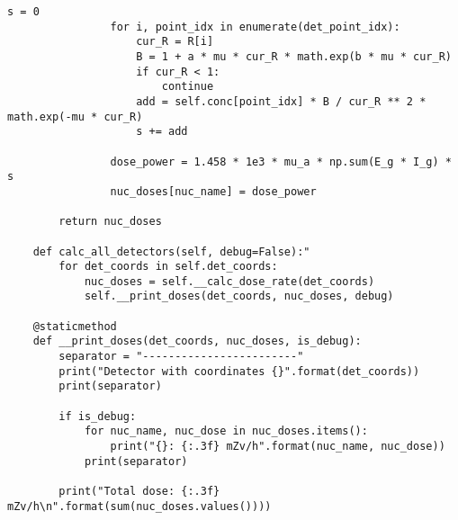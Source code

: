 \begin{lstlisting}[caption=Исходный код модуля расчета мощности эквивалентной дозы внешнего гамма-излучения, 
                    label={lst_dose_calc}, basicstyle=\scriptsize]
                s = 0
                for i, point_idx in enumerate(det_point_idx):
                    cur_R = R[i]
                    B = 1 + a * mu * cur_R * math.exp(b * mu * cur_R)
                    if cur_R < 1:
                        continue
                    add = self.conc[point_idx] * B / cur_R ** 2 * math.exp(-mu * cur_R)
                    s += add

                dose_power = 1.458 * 1e3 * mu_a * np.sum(E_g * I_g) * s
                nuc_doses[nuc_name] = dose_power

        return nuc_doses

    def calc_all_detectors(self, debug=False):"
        for det_coords in self.det_coords:
            nuc_doses = self.__calc_dose_rate(det_coords)
            self.__print_doses(det_coords, nuc_doses, debug)

    @staticmethod
    def __print_doses(det_coords, nuc_doses, is_debug):
        separator = "------------------------"
        print("Detector with coordinates {}".format(det_coords))
        print(separator)

        if is_debug:
            for nuc_name, nuc_dose in nuc_doses.items():
                print("{}: {:.3f} mZv/h".format(nuc_name, nuc_dose))
            print(separator)

        print("Total dose: {:.3f} mZv/h\n".format(sum(nuc_doses.values())))
\end{lstlisting}


\clearpage